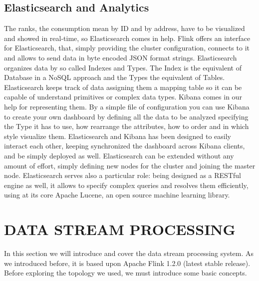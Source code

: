 \subsection{Elasticsearch and Analytics}
The ranks, the consumption mean by ID and by address, have to be visualized and showed in real-time, so Elasticsearch comes in help. Flink offers an interface for Elasticsearch, that, simply providing the cluster configuration, connects to it and allows to send data in byte encoded JSON format strings. Elasticsearch organizes data by so called Indexes and Types. The Index is the equivalent of Database in a NoSQL approach and the Types the equivalent of Tables. Elasticsearch keeps track of data assigning them a mapping table so it can be capable of understand primitives or complex data types. Kibana comes in our help for representing them. By a simple file of configuration you can use Kibana to create your own dashboard by defining all the data to be analyzed specifying the Type it has to use, how rearrange the attributes, how to order and in which style visualize them. Elasticsearch and Kibana has been designed to easily interact each other, keeping synchronized the dashboard across Kibana clients, and be simply deployed as well. Elasticsearch can be extended without any amount of effort, simply defining new nodes for the cluster and joining the master node. Elasticsearch serves also a particular role: being designed as a RESTful engine as well, it allows to specify complex queries and resolves them efficiently, using at its core Apache Lucene, an open source machine learning library.

\section{DATA STREAM PROCESSING}
In this section we will introduce and cover the data stream processing system. As we introduced before, it is based upon Apache Flink 1.2.0 (latest stable release). Before exploring the topology we used, we must introduce some basic concepts.

